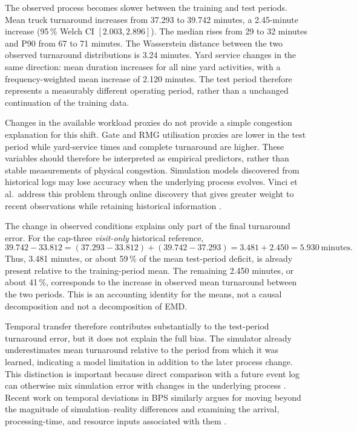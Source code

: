 The observed process becomes slower between the training and test periods.
Mean truck turnaround increases from 37.293 to 39.742 minutes, a
2.45-minute increase (95\,\% Welch CI $[2.003,2.896]$). The median rises
from 29 to 32 minutes and P90 from 67 to 71 minutes. The Wasserstein distance
between the two observed turnaround distributions is 3.24 minutes. Yard
service changes in the same direction: mean duration increases for all nine
yard activities, with a frequency-weighted mean increase of 2.120 minutes.
The test period therefore represents a measurably different operating period,
rather than a unchanged continuation of the training data.

Changes in the available workload proxies do not provide a simple congestion
explanation for this shift. Gate and RMG utilisation proxies are lower in the
test period while yard-service times and complete turnaround are higher.
These variables should therefore be interpreted as empirical predictors, rather
than stable measurements of physical congestion. Simulation
models discovered from historical logs may lose accuracy when the underlying
process evolves. Vinci et al.\ address this problem through online discovery
that gives greater weight to recent observations while retaining historical
information \cite{vinci2025onlinediscoverysimulationmodels}.

The change in observed conditions explains only part of the final turnaround
error. For the cap-three \textit{visit-only} historical reference,
\begin{equation}
39.742-33.812
=
(37.293-33.812)
+
(39.742-37.293)
=
3.481+2.450
=
5.930\ \text{minutes}.
\end{equation}
Thus, 3.481 minutes, or about 59\,\% of the mean test-period deficit, is already
present relative to the training-period mean. The remaining 2.450 minutes,
or about 41\,\%, corresponds to the increase in observed mean turnaround
between the two periods. This is an accounting identity for the means, not a
causal decomposition and not a decomposition of EMD.

Temporal transfer therefore contributes substantially to the test-period
turnaround error, but it does not explain the full bias. The simulator already
underestimates mean turnaround relative to the period from which it was
learned, indicating a model limitation in addition to the later process change.
This distinction is important because direct comparison with a future event log
can otherwise mix simulation error with changes in the underlying process
\cite{Ozdemir2025UtilityBPS}. Recent work on temporal deviations in BPS similarly
argues for moving beyond the magnitude of simulation--reality differences and
examining the arrival, processing-time, and resource inputs associated with
them \cite{Wang2026TemporalDeviations}.

